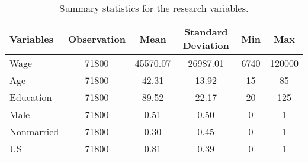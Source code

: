 \begin{table}
\scriptsize
\begin{adjustbox}{width=\textwidth}
\begin{tabular}{l*{1}{ccccc}}

\hline\hline

Variables\footnotemark   & Observation&        Mean&Standard Deviation&         Min&         Max\\
\hline
Wage        &       71800&    45570.07&       26987.01&        6740&  120000\\
Age         &       71800&       42.31&          13.92&          15&       85\\
Education   &       71800&       89.52&          22.17&          20&      125\\
Male        &       71800&        0.51&           0.50&           0&        1\\
Nonmarried  &       71800&        0.30&           0.45&           0&        1\\
US          &       71800&        0.81&           0.39&           0&       1\\
\hline\hline

\end{tabular}
\end{adjustbox}
\caption{\label{tab:summary_statistics}
Summary statistics for the research variables.}
\end{table}

